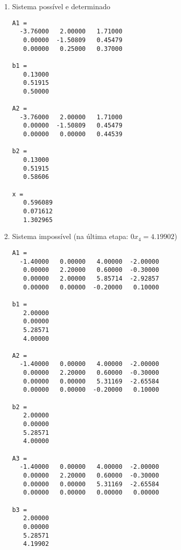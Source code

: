 \documentclass[a4paper]{article}
\begin{document}
\begin{enumerate}
\begin{enumerate}
  \item Sistema possível e determinado
\begin{verbatim}
A1 =
  -3.76000   2.00000   1.71000
   0.00000  -1.50809   0.45479
   0.00000   0.25000   0.37000

b1 =
   0.13000
   0.51915
   0.50000

A2 =
  -3.76000   2.00000   1.71000
   0.00000  -1.50809   0.45479
   0.00000   0.00000   0.44539

b2 =
   0.13000
   0.51915
   0.58606

x =
   0.596089
   0.071612
   1.302965
\end{verbatim}
    
  \item Sistema impossível (na última etapa: $0x_4=4.19902$)
\begin{verbatim}
A1 =
  -1.40000   0.00000   4.00000  -2.00000
   0.00000   2.20000   0.60000  -0.30000
   0.00000   2.00000   5.85714  -2.92857
   0.00000   0.00000  -0.20000   0.10000

b1 =
   2.00000
   0.00000
   5.28571
   4.00000

A2 =
  -1.40000   0.00000   4.00000  -2.00000
   0.00000   2.20000   0.60000  -0.30000
   0.00000   0.00000   5.31169  -2.65584
   0.00000   0.00000  -0.20000   0.10000

b2 =
   2.00000
   0.00000
   5.28571
   4.00000

A3 =
  -1.40000   0.00000   4.00000  -2.00000
   0.00000   2.20000   0.60000  -0.30000
   0.00000   0.00000   5.31169  -2.65584
   0.00000   0.00000   0.00000   0.00000

b3 =
   2.00000
   0.00000
   5.28571
   4.19902
\end{verbatim}



\end{enumerate}
\end{enumerate}
\end{document}
